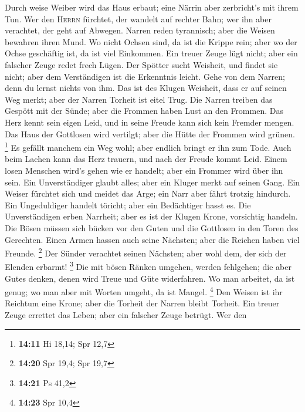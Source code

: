  Durch weise Weiber wird das Haus erbaut; eine Närrin aber
zerbricht's mit ihrem Tun.  Wer den \textsc{Herrn}
fürchtet, der wandelt auf rechter Bahn; wer ihn aber verachtet, der geht
auf Abwegen.  Narren reden tyrannisch; aber die Weisen
bewahren ihren Mund.  Wo nicht Ochsen sind, da ist die
Krippe rein; aber wo der Ochse geschäftig ist, da ist viel Einkommen.
 Ein treuer Zeuge lügt nicht; aber ein falscher Zeuge
redet frech Lügen.  Der Spötter sucht Weisheit, und findet
sie nicht; aber dem Verständigen ist die Erkenntnis leicht.
 Gehe von dem Narren; denn du lernst nichts von ihm.
 Das ist des Klugen Weisheit, dass er auf seinen Weg
merkt; aber der Narren Torheit ist eitel Trug.  Die Narren
treiben das Gespött mit der Sünde; aber die Frommen haben Lust an den
Frommen.  Das Herz kennt sein eigen Leid, und in seine
Freude kann sich kein Fremder mengen.  Das Haus der
Gottlosen wird vertilgt; aber die Hütte der Frommen wird grünen.
\footnote{\textbf{14:11} Hi 18,14; Spr 12,7}  Es gefällt
manchem ein Weg wohl; aber endlich bringt er ihn zum Tode.
 Auch beim Lachen kann das Herz trauern, und nach der
Freude kommt Leid.  Einem losen Menschen wird's gehen wie
er handelt; aber ein Frommer wird über ihn sein.  Ein
Unverständiger glaubt alles; aber ein Kluger merkt auf seinen Gang.
 Ein Weiser fürchtet sich und meidet das Arge; ein Narr
aber fährt trotzig hindurch.  Ein Ungeduldiger handelt
töricht; aber ein Bedächtiger hasst es.  Die
Unverständigen erben Narrheit; aber es ist der Klugen Krone, vorsichtig
handeln.  Die Bösen müssen sich bücken vor den Guten und
die Gottlosen in den Toren des Gerechten.  Einen Armen
hassen auch seine Nächsten; aber die Reichen haben viel Freunde.
\footnote{\textbf{14:20} Spr 19,4; Spr 19,7}  Der Sünder
verachtet seinen Nächsten; aber wohl dem, der sich der Elenden erbarmt!
\footnote{\textbf{14:21} Ps 41,2}  Die mit bösen Ränken
umgehen, werden fehlgehen; die aber Gutes denken, denen wird Treue und
Güte widerfahren.  Wo man arbeitet, da ist genug; wo man
aber mit Worten umgeht, da ist Mangel. \footnote{\textbf{14:23} Spr 10,4}
 Den Weisen ist ihr Reichtum eine Krone; aber die Torheit
der Narren bleibt Torheit.  Ein treuer Zeuge errettet das
Leben; aber ein falscher Zeuge betrügt.  Wer den
